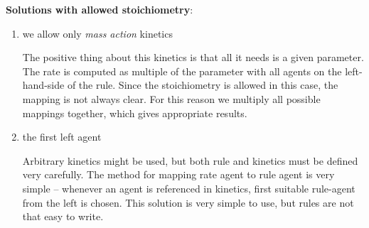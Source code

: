\documentclass[12pt]{fithesis2}
\begin{document}
\textbf{Solutions with allowed stoichiometry}:

\begin{enumerate}
\item we allow only \emph{mass action} kinetics

The positive thing about this kinetics is that all it needs is a given parameter. The rate is computed as multiple of the parameter with all agents on the left-hand-side of the rule. Since the stoichiometry is allowed in this case, the mapping is not always clear. For this reason we multiply all possible mappings together, which gives appropriate results.

\item the first left agent

Arbitrary kinetics might be used, but both rule and kinetics must be defined very carefully. The method for mapping rate agent to rule agent is very simple -- whenever an agent is referenced in kinetics, first suitable rule-agent from the left is chosen. This solution is very simple to use, but rules are not that easy to write.

\end{enumerate}
\end{document}
